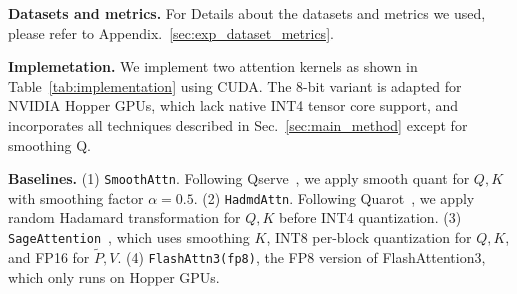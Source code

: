 \noindent \noindent\textbf{Datasets and metrics.} For Details about the datasets and metrics we used, please refer to Appendix.~\ref{sec:exp_dataset_metrics}.

\begin{table}[h!]
    \centering
    \vspace{-1.25em}
    \caption{Two kernel implementations of \our.}
    \label{tab:implementation}
    \setlength\tabcolsep{2pt}
\vspace{-1em}
\end{table}

\noindent\textbf{Implemetation.} We implement two attention kernels as shown in Table~\ref{tab:implementation} using CUDA. The 8-bit variant is adapted for NVIDIA Hopper GPUs, which lack native INT4 tensor core support, and incorporates all techniques described in Sec.~\ref{sec:main_method} except for smoothing Q.

\noindent \noindent\textbf{Baselines.} 
(1) \texttt{SmoothAttn}. Following Qserve~\cite{lin2024qserve}, we apply smooth quant for $Q, K$ with smoothing factor $\alpha=0.5$.
(2) \texttt{HadmdAttn}. Following Quarot~\cite{ashkboos2024quarot}, we apply random Hadamard transformation for $Q, K$ before INT4 quantization. (3) \texttt{SageAttention}~\cite{2024sageattention}, which uses smoothing $K$, INT8 per-block quantization for $Q,K$, and FP16 for $\widetilde{P},V$. (4) \texttt{FlashAttn3(fp8)}, the FP8 version of FlashAttention3, which only runs on Hopper GPUs.





